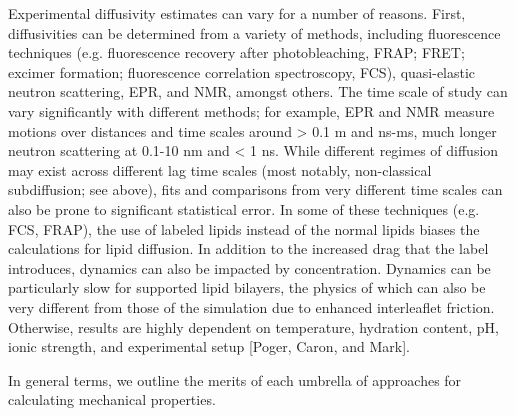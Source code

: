 \documentclass[9pt,bestpractices]{livecoms}
\begin{document}
Experimental diffusivity estimates can vary for a number of reasons.
First, diffusivities can be determined from a variety of methods, including fluorescence techniques (e.g. fluorescence recovery after photobleaching, FRAP; FRET; excimer formation; fluorescence correlation spectroscopy, FCS), quasi-elastic neutron scattering, EPR, and NMR, amongst others.
The time scale of study can vary significantly with different methods; for example, EPR and NMR measure motions over distances and time scales around > 0.1 m and ns-ms, much longer neutron scattering at 0.1-10 nm and < 1 ns.
While different regimes of diffusion may exist across different lag time scales (most notably, non-classical subdiffusion; see above), fits and comparisons from very different time scales can also be prone to significant statistical error.
In some of these techniques (e.g. FCS, FRAP), the use of labeled lipids instead of the normal lipids biases the calculations for lipid diffusion.
In addition to the increased drag that the label introduces, dynamics can also be impacted by concentration.
Dynamics can be particularly slow for supported lipid bilayers, the physics of which can also be very different from those of the simulation due to enhanced interleaflet friction.
Otherwise, results are highly dependent on temperature, hydration content, pH, ionic strength, and experimental setup [Poger, Caron, and Mark].

In general terms, we outline the merits of each umbrella of approaches for calculating mechanical properties.
\end{document}
